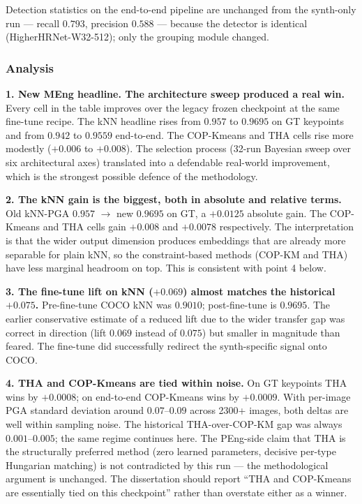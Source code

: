 \vspace{0.5em}

Detection statistics on the end-to-end pipeline are unchanged from the synth-only run --- recall $0.793$, precision $0.588$ --- because the detector is identical (HigherHRNet-W32-512); only the grouping module changed.

\subsubsection{Analysis}

\textbf{1. New MEng headline. The architecture sweep produced a real win.} Every cell in the table improves over the legacy frozen checkpoint at the same fine-tune recipe. The kNN headline rises from $0.957$ to $\mathbf{0.9695}$ on GT keypoints and from $0.942$ to $\mathbf{0.9559}$ end-to-end. The COP-Kmeans and THA cells rise more modestly ($+0.006$ to $+0.008$). The selection process (32-run Bayesian sweep over six architectural axes) translated into a defendable real-world improvement, which is the strongest possible defence of the methodology.

\textbf{2. The kNN gain is the biggest, both in absolute and relative terms.} Old kNN-PGA $0.957$ $\rightarrow$ new $0.9695$ on GT, a $+0.0125$ absolute gain. The COP-Kmeans and THA cells gain $+0.008$ and $+0.0078$ respectively. The interpretation is that the wider output dimension produces embeddings that are already more separable for plain kNN, so the constraint-based methods (COP-KM and THA) have less marginal headroom on top. This is consistent with point 4 below.

\textbf{3. The fine-tune lift on kNN ($+0.069$) almost matches the historical $+0.075$.} Pre-fine-tune COCO kNN was $0.9010$; post-fine-tune is $0.9695$. The earlier conservative estimate of a reduced lift due to the wider transfer gap was correct in direction (lift $0.069$ instead of $0.075$) but smaller in magnitude than feared. The fine-tune did successfully redirect the synth-specific signal onto COCO.

\textbf{4. THA and COP-Kmeans are tied within noise.} On GT keypoints THA wins by $+0.0008$; on end-to-end COP-Kmeans wins by $+0.0009$. With per-image PGA standard deviation around $0.07$--$0.09$ across 2300+ images, both deltas are well within sampling noise. The historical THA-over-COP-KM gap was always $0.001$--$0.005$; the same regime continues here. The PEng-side claim that THA is the structurally preferred method (zero learned parameters, decisive per-type Hungarian matching) is not contradicted by this run --- the methodological argument is unchanged. The dissertation should report ``THA and COP-Kmeans are essentially tied on this checkpoint'' rather than overstate either as a winner.

